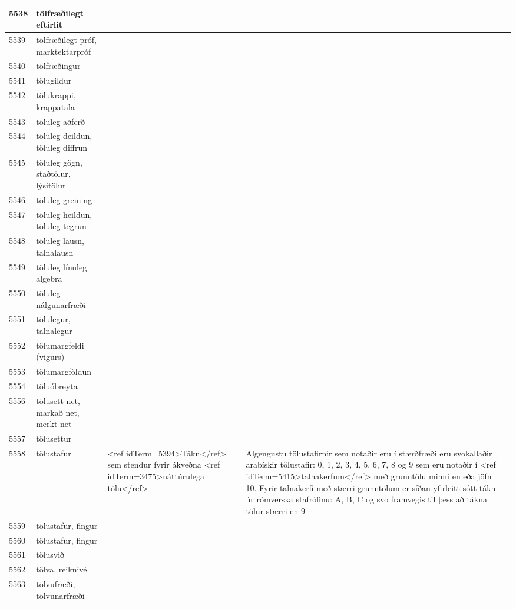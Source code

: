 \begin{longtable}{p{}|p{}|p{}|p{}|p{}}
\hline
5538 & tölfræðilegt eftirlit &  &  &  \\
\hline
5539 & tölfræðilegt próf, marktektarpróf &  &  &  \\
\hline
5540 & tölfræðingur &  &  &  \\
\hline
5541 & tölugildur &  &  &  \\
\hline
5542 & tölukrappi, krappatala &  &  &  \\
\hline
5543 & töluleg aðferð &  &  &  \\
\hline
5544 & töluleg deildun, töluleg diffrun &  &  &  \\
\hline
5545 & töluleg gögn, staðtölur, lýsitölur &  &  &  \\
\hline
5546 & töluleg greining &  &  &  \\
\hline
5547 & töluleg heildun, töluleg tegrun &  &  &  \\
\hline
5548 & töluleg lausn, talnalausn &  &  &  \\
\hline
5549 & töluleg línuleg algebra &  &  &  \\
\hline
5550 & töluleg nálgunarfræði &  &  &  \\
\hline
5551 & tölulegur, talnalegur &  &  &  \\
\hline
5552 & tölumargfeldi (vigurs) &  &  &  \\
\hline
5553 & tölumargföldun &  &  &  \\
\hline
5554 & töluóbreyta &  &  &  \\
\hline
5556 & tölusett net, markað net, merkt net &  &  &  \\
\hline
5557 & tölusettur &  &  &  \\
\hline
5558 & tölustafur & <ref idTerm=5394>Tákn</ref> sem stendur fyrir ákveðna <ref idTerm=3475>náttúrulega tölu</ref> & Algengustu tölustafirnir sem notaðir eru í stærðfræði eru svokallaðir arabískir tölustafir: 0, 1, 2, 3, 4, 5, 6, 7, 8 og 9 sem eru notaðir í <ref idTerm=5415>talnakerfum</ref> með grunntölu minni en eða jöfn 10. Fyrir talnakerfi með stærri grunntölum er síðan yfirleitt sótt tákn úr rómverska stafrófinu: A, B, C og svo framvegis til þess að tákna tölur stærri en 9 &  \\
\hline
5559 & tölustafur, fingur &  &  &  \\
\hline
5560 & tölustafur, fingur &  &  &  \\
\hline
5561 & tölusvið &  &  &  \\
\hline
5562 & tölva, reiknivél &  &  &  \\
\hline
5563 & tölvufræði, tölvunarfræði &  &  &  \\

\end{longtable}
